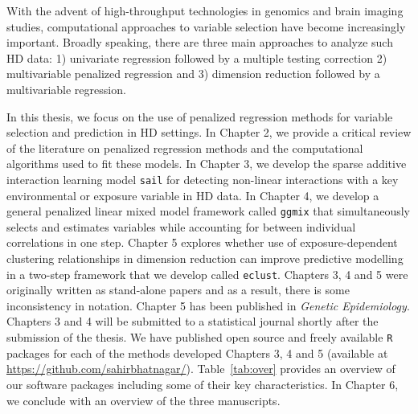 With the advent of high-throughput technologies in genomics and brain imaging studies, computational approaches to variable selection have become increasingly important. Broadly speaking, there are three main approaches to analyze such HD data: 1) univariate regression followed by a multiple testing correction 2) multivariable penalized regression and 3) dimension reduction followed by a multivariable regression. 

In this thesis, we focus on the use of penalized regression methods for variable selection and prediction in HD settings. In Chapter 2, we provide a critical review of the literature on penalized regression methods and the computational algorithms used to fit these models. In Chapter 3, we develop the sparse additive interaction learning model \texttt{sail} for detecting non-linear interactions with a key environmental or exposure variable in HD data. In Chapter 4, we develop a general penalized linear mixed model framework called \texttt{ggmix} that simultaneously selects and estimates variables while accounting for between individual correlations in one step. Chapter 5 explores whether use of exposure-dependent clustering relationships in dimension reduction can improve predictive modelling in a two-step framework that we develop called \texttt{eclust}. Chapters 3, 4 and 5 were originally written as stand-alone papers and as a result, there is some inconsistency in notation. Chapter 5 has been published in \textit{Genetic Epidemiology}. Chapters 3 and 4 will be submitted to a statistical journal shortly after the submission of the thesis. We have published open source and freely available \texttt{R} packages for each of the methods developed Chapters 3, 4 and 5 (available at \url{https://github.com/sahirbhatnagar/}). Table~\ref{tab:over} provides an overview of our software packages including some of their key characteristics. In Chapter 6, we conclude with an overview of the three manuscripts.  


